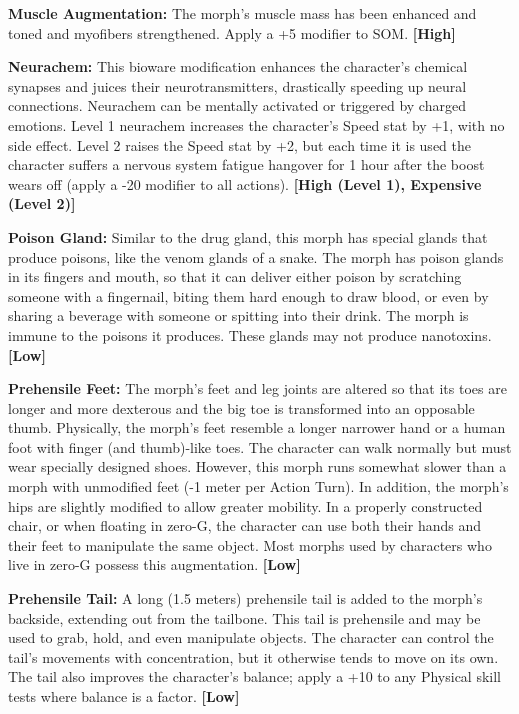 \textbf{Muscle Augmentation:} The morph’s muscle mass has been enhanced and toned and myofibers strengthened. Apply a +5 modifier to SOM. \textbf{[High]} 

\textbf{Neurachem:} This bioware modification enhances the character’s chemical synapses and juices their neurotransmitters, drastically speeding up neural connections. Neurachem can be mentally activated or triggered by charged emotions. Level 1 neurachem increases the character’s Speed stat by +1, with no side effect. Level 2 raises the Speed stat by +2, but each time it is used the character suffers a nervous system fatigue hangover for 1 hour after the boost wears off (apply a -20 modifier to all actions). \textbf{[High (Level 1), Expensive (Level 2)]} 

\textbf{Poison Gland:} Similar to the drug gland, this morph has special glands that produce poisons, like the venom glands of a snake. The morph has poison glands in its fingers and mouth, so that it can deliver either poison by scratching someone with a fingernail, biting them hard enough to draw blood, or even by sharing a beverage with someone or spitting into their drink. The morph is immune to the poisons it produces. These glands may not produce nanotoxins. \textbf{[Low]} 

\textbf{Prehensile Feet:} The morph’s feet and leg joints are altered so that its toes are longer and more dexterous and the big toe is transformed into an opposable thumb. Physically, the morph’s feet resemble a longer narrower hand or a human foot with finger (and thumb)-like toes. The character can walk normally but must wear specially designed shoes. However, this morph runs somewhat slower than a morph with unmodified feet (-1 meter per Action Turn). In addition, the morph’s hips are slightly modified to allow greater mobility. In a properly constructed chair, or when floating in zero-G, the character can use both their hands and their feet to manipulate the same object. Most morphs used by characters who live in zero-G possess this augmentation. \textbf{[Low]} 

\textbf{Prehensile Tail:} A long (1.5 meters) prehensile tail is added to the morph’s backside, extending out from the tailbone. This tail is prehensile and may be used to grab, hold, and even manipulate objects. The character can control the tail’s movements with concentration, but it otherwise tends to move on its own. The tail also improves the character’s balance; apply a +10 to any Physical skill tests where balance is a factor. \textbf{[Low]} 

